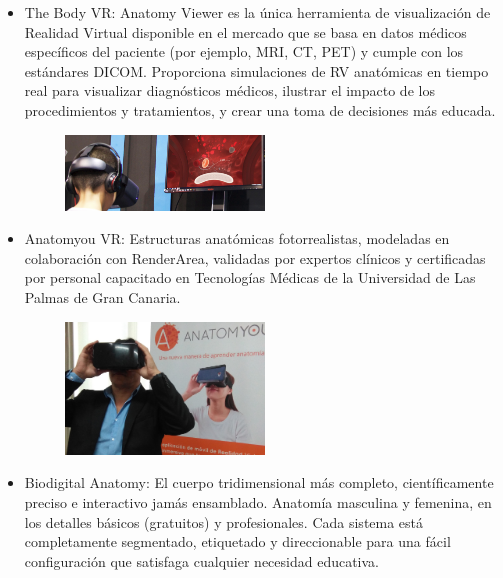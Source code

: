\begin{itemize}
\item The Body VR: Anatomy Viewer es la única herramienta de visualización de Realidad Virtual disponible en el mercado que se basa en datos médicos específicos del 
paciente (por ejemplo, MRI, CT, PET) y cumple con los estándares DICOM. Proporciona simulaciones de RV anatómicas en tiempo real para visualizar diagnósticos médicos, 
ilustrar el impacto de los procedimientos y tratamientos, y crear una toma de decisiones más educada.
\begin{figure}[H]
	\begin{center}
 		\includegraphics[width = 0.5\textwidth]{source/images/image9.png}
	\end{center} 
\end{figure}
\item Anatomyou VR: Estructuras anatómicas fotorrealistas, modeladas en colaboración con RenderArea, validadas por expertos clínicos y certificadas por personal capacitado 
en  Tecnologías Médicas de la Universidad de Las Palmas de Gran Canaria.
\begin{figure}[H]
	\begin{center}
 		\includegraphics[width = 0.5\textwidth]{source/images/image59.png}
	\end{center} 
\end{figure}
\item Biodigital Anatomy: El cuerpo tridimensional más completo, científicamente preciso e interactivo jamás ensamblado. Anatomía masculina y femenina, en los detalles 
básicos (gratuitos) y profesionales. Cada sistema está completamente segmentado, etiquetado y direccionable para una fácil configuración que satisfaga cualquier necesidad educativa.

\end{itemize}
